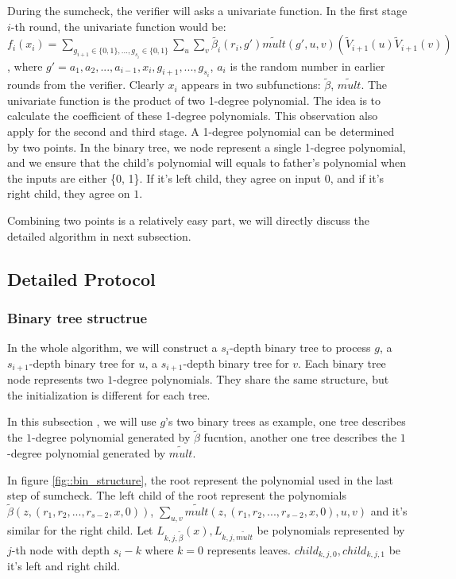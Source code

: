 During the sumcheck, the verifier will asks a univariate function. In the first stage $i$-th round, the univariate function would be: $f_i(x_i)=\sum_{g_{i+1} \in \{0, 1\}, ..., g_{s_{i}} \in \{0, 1\}} \sum_{u} \sum_{v} \tilde{\beta_{i}}(r_i, g')\tilde{mult}(g', u, v)(\tilde{V}_{i+1}(u)\tilde{V}_{i+1}(v))$, where $g' = a_1, a_2, ..., a_{i-1}, x_{i}, g_{i+1}, ..., g_{s_i}$, $a_i$ is the random number in earlier rounds from the verifier. Clearly $x_i$ appears in two subfunctions: $\tilde{\beta}$, $\tilde{mult}$. The univariate function is the product of two 1-degree polynomial. The idea is to calculate the coefficient of these 1-degree polynomials. This observation also apply for the second and third stage. A 1-degree polynomial can be determined by two points. In the binary tree, we node represent a single 1-degree polynomial, and we ensure that the child's polynomial will equals to father's polynomial when the inputs are either \{0, 1\}. If it's left child, they agree on input $0$, and if it's right child, they agree on $1$.

Combining two points is a relatively easy part, we will directly discuss the detailed algorithm in next subsection.

\subsection{Detailed Protocol}
\subsubsection{Binary tree structrue}
In the whole algorithm, we will construct a $s_i$-depth binary tree to process $g$, a $s_{i+1}$-depth binary tree for $u$, a $s_{i+1}$-depth binary tree for $v$. Each binary tree node represents two $1$-degree polynomials. They share the same structure, but the initialization is different for each tree. 

In this subsection , we will use $g$'s two binary trees as example, one tree describes the $1$-degree polynomial generated by $\tilde{\beta}$ fucntion, another one tree describes the $1$-degree polynomial generated by $\tilde{mult}$. 

In figure \ref{fig::bin_structure}, the root represent the polynomial used in the last step of sumcheck. The left child of the root represent the polynomials $\tilde{\beta}(z, (r_1, r_2, ..., r_{s-2}, x, 0))$, $\sum_{u, v}\tilde{mult}(z, (r_1, r_2, ..., r_{s-2}, x, 0), u, v)$ and it's similar for the right child. Let $L_{k, j, \tilde{\beta}}(x), L_{k, j, \tilde{mult}}$ be polynomials represented by $j$-th node with depth $s_i - k$ where $k=0$ represents leaves. $child_{k, j, 0}, child_{k, j, 1}$ be it's left and right child. 

